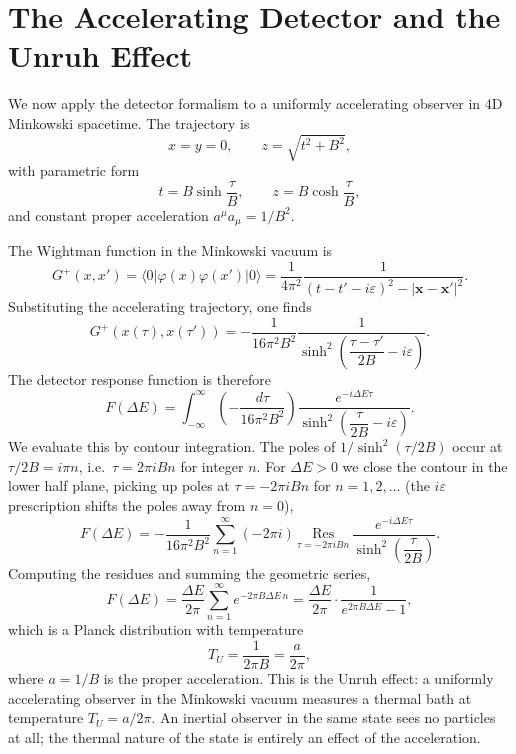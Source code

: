 \section{The Accelerating Detector and the Unruh Effect}

We now apply the detector formalism to a uniformly accelerating
observer in 4D Minkowski spacetime. The trajectory is
\begin{equation}
	x = y = 0, \qquad z = \sqrt{t^2+B^2},
\end{equation}
with parametric form
\begin{equation}
	t = B\sinh\frac{\tau}{B}, \qquad z = B\cosh\frac{\tau}{B},
\end{equation}
and constant proper acceleration $a^\mu a_\mu = 1/B^2$.


The Wightman function in the Minkowski vacuum is
\begin{equation}
	G^+(x,x') = \langle 0|\varphi(x)\varphi(x')|0\rangle
	= \frac{1}{4\pi^2}
	\frac{1}{(t-t'-i\varepsilon)^2 - |\mathbf{x}-\mathbf{x}'|^2}.
\end{equation}
Substituting the accelerating trajectory, one finds
\begin{equation}
	G^+(x(\tau),x(\tau'))
	= -\frac{1}{16\pi^2 B^2}
	\frac{1}{\sinh^2\!\left(\dfrac{\tau-\tau'}{2B}
		- i\varepsilon\right)}.
\end{equation}
The detector response function is therefore
\begin{equation}
	F(\Delta E) = \int_{-\infty}^{\infty}
	\left(-\frac{d\tau}{16\pi^2 B^2}\right)
	\frac{e^{-i\Delta E\tau}}
	{\sinh^2\!\left(\dfrac{\tau}{2B}-i\varepsilon\right)}.
\end{equation}
We evaluate this by contour integration. The poles of
$1/\sinh^2(\tau/2B)$ occur at $\tau/2B = i\pi n$, i.e.\
$\tau = 2\pi i Bn$ for integer $n$. For $\Delta E > 0$ we close the
contour in the lower half plane, picking up poles at
$\tau = -2\pi iBn$ for $n = 1, 2, \ldots$ (the $i\varepsilon$
prescription shifts the poles away from $n=0$),
\begin{equation}
	F(\Delta E) = -\frac{1}{16\pi^2 B^2}
	\sum_{n=1}^{\infty}(-2\pi i)\,
	\underset{\tau=-2\pi iBn}{\mathrm{Res}}\,
	\frac{e^{-i\Delta E\tau}}
	{\sinh^2\!\left(\dfrac{\tau}{2B}\right)}.
\end{equation}
Computing the residues and summing the geometric series,
\begin{equation}
	F(\Delta E) = \frac{\Delta E}{2\pi}
	\sum_{n=1}^{\infty}e^{-2\pi B\Delta E\,n}
	= \boxed{\frac{\Delta E}{2\pi}
		\cdot\frac{1}{e^{2\pi B\Delta E}-1},}
\end{equation}
which is a Planck distribution with temperature
\begin{equation}
	T_U = \frac{1}{2\pi B} = \frac{a}{2\pi},
\end{equation}
where $a = 1/B$ is the proper acceleration. This is the Unruh effect:
a uniformly accelerating observer in the Minkowski vacuum measures a
thermal bath at temperature $T_U = a/2\pi$. An inertial observer in
the same state sees no particles at all; the thermal nature of the
state is entirely an effect of the acceleration.

